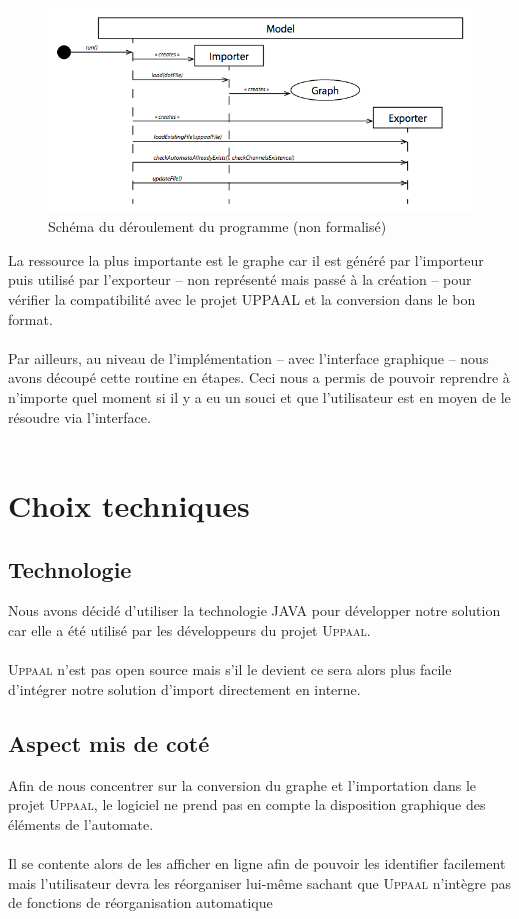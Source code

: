 \documentclass[12pt,a4paper]{report}
\begin{document}
\begin{figure}[!h]
  \centering
  \includegraphics[scale=0.6]{ressources/deroulement.png}
  \caption{Schéma du déroulement du programme (non formalisé)}
\end{figure}

La ressource la plus importante est le graphe car il est généré par l'importeur 
puis utilisé par l'exporteur -- non représenté mais passé à la création -- pour 
vérifier la compatibilité avec le projet UPPAAL et la conversion dans le bon format.
\\\\
Par ailleurs, au niveau de l'implémentation -- avec l'interface graphique -- nous 
avons découpé cette routine en étapes. Ceci nous a permis de pouvoir reprendre 
à n'importe quel moment si il y a eu un souci et que l'utilisateur est en moyen de 
le résoudre via l'interface.
\\\\

\section{Choix techniques}
\subsection*{Technologie}
Nous avons décidé d'utiliser la technologie JAVA pour développer notre 
solution car elle a été utilisé par les développeurs du projet \textsc{Uppaal}.
\\\\
\textsc{Uppaal} n'est pas open source mais s'il le devient ce sera alors plus facile d'intégrer
notre solution d'import directement en interne.

\subsection*{Aspect mis de coté}
Afin de nous concentrer sur la conversion du graphe et l'importation dans le projet \textsc{Uppaal},
le logiciel ne prend pas en compte la disposition graphique des éléments de l'automate.
\\\\
Il se contente alors de les afficher en ligne afin de pouvoir les identifier facilement mais 
l'utilisateur devra les réorganiser lui-même sachant que \textsc{Uppaal} n'intègre pas de fonctions de 
réorganisation automatique
\end{document}
